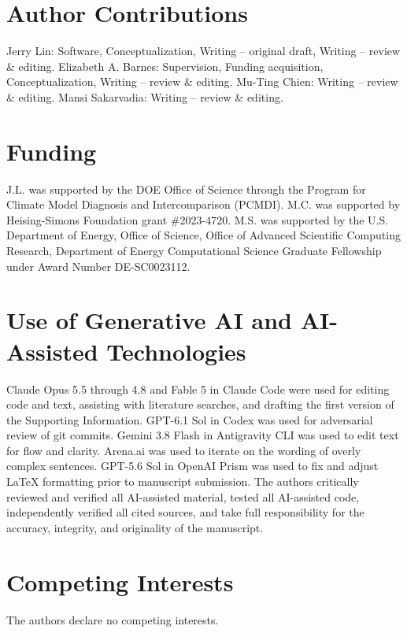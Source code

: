\documentclass[final]{agujournal2019}
\begin{document}
\section*{Author Contributions}

Jerry Lin: Software, Conceptualization, Writing -- original draft, Writing -- review \& editing.
Elizabeth A. Barnes: Supervision, Funding acquisition, Conceptualization, Writing -- review \& editing.
Mu-Ting Chien: Writing -- review \& editing.
Mansi Sakarvadia: Writing -- review \& editing.

\section*{Funding}

J.L. was supported by the DOE Office of Science through the Program for Climate Model Diagnosis and Intercomparison (PCMDI). M.C. was supported by Heising-Simons Foundation grant \#2023-4720. M.S. was supported by the U.S. Department of Energy, Office of Science, Office of Advanced Scientific Computing Research, Department of Energy Computational Science
Graduate Fellowship under Award Number DE-SC0023112.



\section*{Use of Generative AI and AI-Assisted Technologies}

Claude Opus 5.5 through 4.8 and Fable 5 in Claude Code were used for editing code and text, assisting with literature searches, and drafting the first version of the Supporting Information. GPT-6.1 Sol in Codex was used for adversarial review of git commits. Gemini 3.8 Flash in Antigravity CLI was used to edit text for flow and clarity. Arena.ai was used to iterate on the wording of overly complex sentences. GPT-5.6 Sol in OpenAI Prism was used to fix and adjust LaTeX formatting prior to manuscript submission. The authors critically reviewed and verified all AI-assisted material, tested all AI-assisted code, independently verified all cited sources, and take full responsibility for the accuracy, integrity, and originality of the manuscript.

\section*{Competing Interests}

The authors declare no competing interests.




\clearpage


\end{document}
